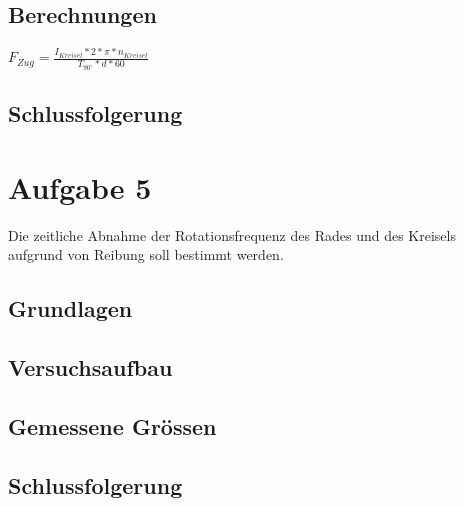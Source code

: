 \documentclass{article}
\begin{document}
\subsection{Berechnungen}
$F_{Zug}=\frac{I_{Kreisel}*2*\pi*n_{Kreisel}}{T_{90^\circ }*d*60}$
\subsection{Schlussfolgerung}

\section{Aufgabe 5}

Die zeitliche Abnahme der Rotationsfrequenz des Rades und des Kreisels aufgrund von
Reibung soll bestimmt werden.
\subsection{Grundlagen}
\subsection{Versuchsaufbau}
\subsection{Gemessene Grössen}
\subsection{Schlussfolgerung}
\end{document}

